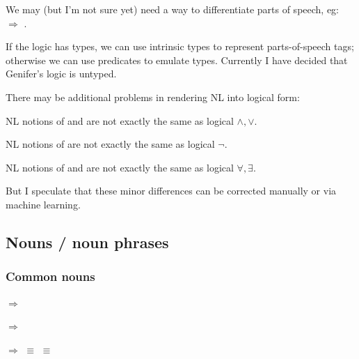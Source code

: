 We may (but I'm not sure yet) need a way to differentiate parts of speech, eg:\\
\tab {} $\Longrightarrow$ .

If the logic has types, we can use intrinsic types to represent parts-of-speech tags; otherwise we can use predicates to emulate types.  Currently I have decided that Genifer's logic is untyped.  %


There may be additional problems in rendering NL into logical form:
\begin{compactenum}[\textbullet ]
\item NL notions of  and  are not exactly the same as logical $\wedge, \vee$.
\item NL notions of  are not exactly the same as logical $\neg$.
\item NL notions of  and  are not exactly the same as logical $\forall, \exists$.
\end{compactenum}
But I speculate that these minor differences can be corrected manually or via machine learning.

\subsection{Nouns / noun phrases}


\subsubsection{Common nouns}

 $\Longrightarrow$ 

 $\Longrightarrow$ 

 $\Longrightarrow$  $\equiv$  $\equiv$ 

